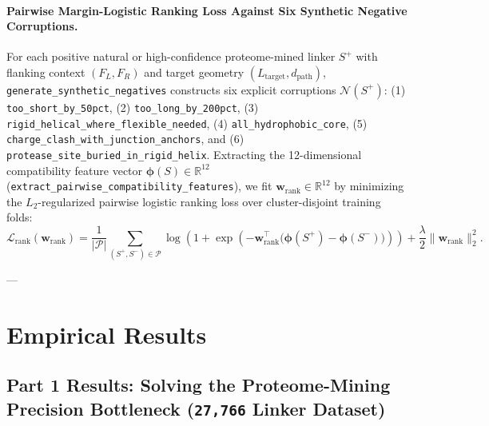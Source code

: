 \documentclass[11pt]{article}
\begin{document}
\paragraph{Pairwise Margin-Logistic Ranking Loss Against Six Synthetic Negative Corruptions.}
For each positive natural or high-confidence proteome-mined linker $S^+$ with flanking context $(F_L, F_R)$ and target geometry $(L_{\text{target}}, d_{\text{path}})$, \texttt{generate\_synthetic\_negatives} constructs six explicit corruptions $\mathcal{N}(S^+)$: (1) \texttt{too\_short\_by\_50pct}, (2) \texttt{too\_long\_by\_200pct}, (3) \texttt{rigid\_helical\_where\_flexible\_needed}, (4) \texttt{all\_hydrophobic\_core}, (5) \texttt{charge\_clash\_with\_junction\_anchors}, and (6) \texttt{protease\_site\_buried\_in\_rigid\_helix}. Extracting the 12-dimensional compatibility feature vector $\boldsymbol{\phi}(S) \in \mathbb{R}^{12}$ (\texttt{extract\_pairwise\_compatibility\_features}), we fit $\mathbf{w}_{\text{rank}} \in \mathbb{R}^{12}$ by minimizing the $L_2$-regularized pairwise logistic ranking loss over cluster-disjoint training folds:
\begin{equation}
  \mathcal{L}_{\text{rank}}(\mathbf{w}_{\text{rank}}) = \frac{1}{|\mathcal{P}|} \sum_{(S^+, S^-) \in \mathcal{P}} \log\!\left(1 + \exp\!\left(-\mathbf{w}_{\text{rank}}^\top \big(\boldsymbol{\phi}(S^+) - \boldsymbol{\phi}(S^-)\big)\right)\right) + \frac{\lambda}{2}\|\mathbf{w}_{\text{rank}}\|_2^2.
\end{equation}

---

\section{Empirical Results}
\label{sec:results}

\subsection{Part 1 Results: Solving the Proteome-Mining Precision Bottleneck (\texttt{27,766} Linker Dataset)}
\label{sec:part1}
\end{document}
